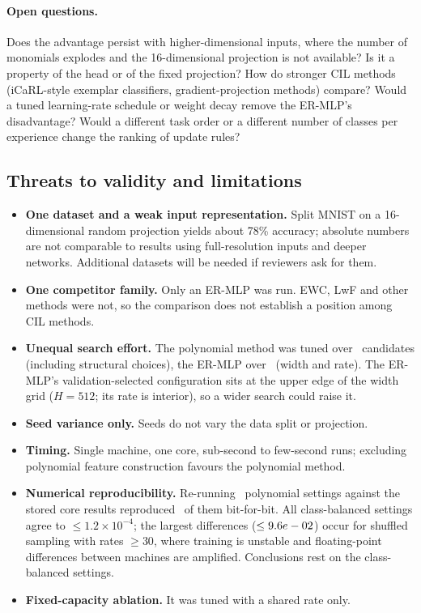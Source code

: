 \documentclass[11pt,a4paper]{article}
\begin{document}
\paragraph{Open questions.}
Does the advantage persist with higher-dimensional inputs, where the number of monomials explodes and the 16-dimensional projection is not available? Is it a property of the head or of the fixed projection? How do stronger CIL methods (iCaRL-style exemplar classifiers, gradient-projection methods) compare? Would a tuned learning-rate schedule or weight decay remove the ER-MLP's disadvantage? Would a different task order or a different number of classes per experience change the ranking of update rules?

\subsection*{Threats to validity and limitations}
\begin{itemize}
\item \textbf{One dataset and a weak input representation.} Split MNIST on a 16-dimensional random projection yields about 78\% accuracy; absolute numbers are not comparable to results using full-resolution inputs and deeper networks. Additional datasets will be needed if reviewers ask for them.
\item \textbf{One competitor family.} Only an ER-MLP was run. EWC, LwF and other methods were not, so the comparison does not establish a position among CIL methods.
\item \textbf{Unequal search effort.} The polynomial method was tuned over \numPolyCandidatesThree\ candidates (including structural choices), the ER-MLP over \numErCandidates\ (width and rate). The ER-MLP's validation-selected configuration sits at the upper edge of the width grid ($H{=}512$; its rate is interior), so a wider search could raise it.
\item \textbf{Seed variance only.} Seeds do not vary the data split or projection.
\item \textbf{Timing.} Single machine, one core, sub-second to few-second runs; excluding polynomial feature construction favours the polynomial method.
\item \textbf{Numerical reproducibility.} Re-running \numReproChecks\ polynomial settings against the stored core results reproduced \numReproExact\ of them bit-for-bit. All class-balanced settings agree to $\le 1.2\times10^{-4}$; the largest differences ($\le 9.6e-02$) occur for shuffled sampling with rates $\ge30$, where training is unstable and floating-point differences between machines are amplified. Conclusions rest on the class-balanced settings.
\item \textbf{Fixed-capacity ablation.} It was tuned with a shared rate only.
\end{itemize}
\end{document}
